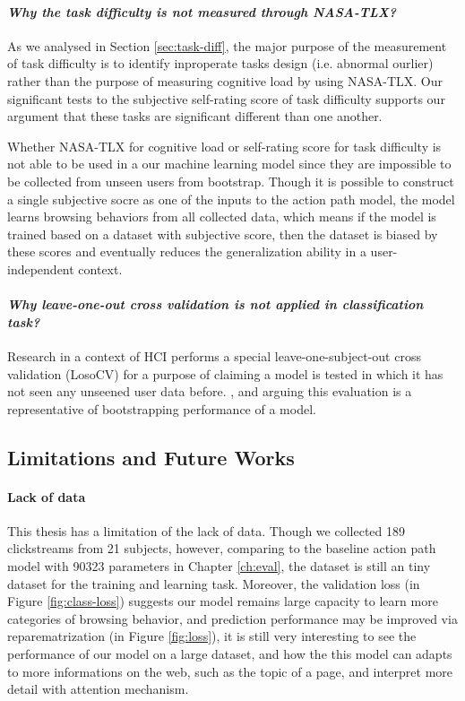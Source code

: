 \paragraph{\emph{Why the task difficulty is not measured through NASA-TLX?}}

As we analysed in Section \ref{sec:task-diff}, the major purpose of the measurement of 
task difficulty is to identify inproperate tasks design (i.e. abnormal ourlier) 
rather than the purpose of measuring cognitive load by using NASA-TLX.
Our significant tests to the subjective self-rating score of task difficulty supports
our argument that these tasks are significant different than one another.

Whether NASA-TLX for cognitive load or self-rating score for task difficulty is not able to be used in
a our machine learning model since they are impossible to be collected from unseen users from bootstrap.
Though it is possible to construct a single subjective socre as one of the inputs to the action path model,
the model learns browsing behaviors from all collected data, which means if the model is trained based on 
a dataset with subjective score, then the dataset is biased by these scores and eventually reduces the 
generalization ability in a user-independent context.

\paragraph{\emph{Why leave-one-out cross validation is not applied in classification task?}}

Research in a context of HCI performs a special leave-one-subject-out cross validation (LosoCV)
for a purpose of claiming a model is tested in which it has not seen any unseened user data before.
\cite{}, and arguing this evaluation is a representative of bootstrapping performance of a model.




\subsection{Limitations and Future Works}

\paragraph{Lack of data} 
This thesis has a limitation of the lack of data. 
Though we collected 189 clickstreams from 21 subjects, however, 
comparing to the baseline action path model with 90323 parameters in Chapter \ref{ch:eval},
the dataset is still an tiny dataset for the training and learning task.
Moreover, the validation loss (in Figure \ref{fig:class-loss}) suggests our model remains large capacity to learn more
categories of browsing behavior, and prediction performance may be improved
via reparematrization (in Figure \ref{fig:loss}), 
it is still very interesting to see the performance of our model on a large dataset,
and how the this model can adapts to more informations on the web, such as the topic of 
a page, and interpret more detail with attention mechanism.

